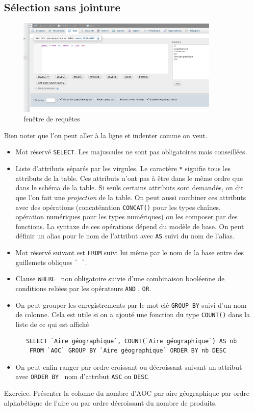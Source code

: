 \subsection{Sélection sans jointure}
\begin{figure}[h]
  \centering
  \includegraphics[width=10cm]{./introbdd_requete.png}
  \caption{fenêtre de requêtes}
  \label{fig:requete}
\end{figure}
Bien noter que l'on peut aller à la ligne et indenter comme on veut.
\begin{itemize}
  \item Mot réservé \verb|SELECT|. Les majuscules ne sont pas obligatoires mais conseillées.
  \item Liste d'attributs séparés par les virgules. Le caractère \verb|*| signifie tous les attributs de la table. Ces attributs n'ont pas à être dans le même ordre que dans le schéma de la table. Si seuls certains attributs sont demandés, on dit que l'on fait une \emph{projection} de la table. On peut aussi combiner ces attributs avec des opérations (concaténation \verb|CONCAT()| pour les types chaînes, opération numériques pour les types numériques) ou les composer par des fonctions. La syntaxe de ces opérations dépend du modèle de base. On peut définir un alias pour le nom de l'attribut avec \verb|AS| suivi du nom de l'alias.
  \item Mot réservé suivant est \verb|FROM| suivi lui même par le nom de la base entre des guillemets obliques \verb|` `|.
  \item Clause \verb|WHERE | non obligatoire suivie d'une combinaison booléenne de conditions reliées par les opérateurs \verb|AND| , \verb|OR|.
  \item On peut grouper les enregistrements par le mot clé \verb|GROUP BY| suivi d'un nom de colonne. Cela est utile si on a ajouté une fonction du type \verb|COUNT()| dans la liste de ce qui est affiché
  \begin{verbatim}
   SELECT `Aire géographique`, COUNT(`Aire géographique`) AS nb 
    FROM `AOC` GROUP BY `Aire géographique` ORDER BY nb DESC
  \end{verbatim}
  \item On peut enfin ranger par ordre croissant ou décroissant suivant un attribut avec \verb|ORDER BY | nom d'attribut \verb|ASC| ou \verb|DESC|.
\end{itemize}
Exercice. Présenter la colonne du nombre d'AOC par aire géographique par ordre alphabétique de l'aire ou par ordre décroissant du nombre de produits.

